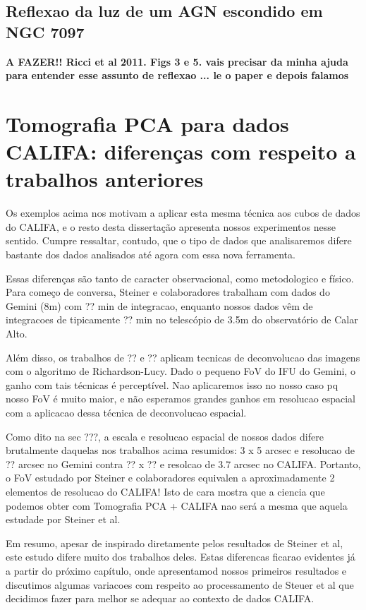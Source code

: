 \subsection{Reflexao da luz de um AGN escondido em NGC 7097}

{\bf\ojo A FAZER!! \ojo Ricci et al 2011. Figs 3 e 5. vais precisar da minha ajuda para entender esse assunto de reflexao ... le o paper e depois falamos}


\section{\ojo Tomografia PCA para dados CALIFA: diferenças com respeito a trabalhos anteriores}

Os exemplos acima nos motivam a aplicar esta mesma técnica aos cubos de dados do CALIFA, e o resto desta dissertação
apresenta nossos experimentos nesse sentido. Cumpre ressaltar, contudo, que o tipo de dados que analisaremos difere
bastante dos dados analisados até agora com essa nova ferramenta.

Essas diferenças são tanto de caracter observacional, como metodologico e físico. Para começo de conversa, Steiner e
colaboradores trabalham com dados do Gemini (8m) com ?? min de integracao, enquanto nossos dados vêm de integracoes de
tipicamente ?? min no telescópio de 3.5m do observatório de Calar Alto.

Além disso, os trabalhos de ?? e ?? aplicam tecnicas de deconvolucao das imagens com o algoritmo de Richardson-Lucy.
Dado o pequeno FoV do IFU do Gemini, o ganho com tais técnicas é perceptível. Nao aplicaremos isso no nosso caso pq
nosso FoV é muito maior, e não esperamos grandes ganhos em resolucao espacial com a aplicacao dessa técnica de
deconvolucao espacial.

Como dito na sec ???, a escala e resolucao espacial de nossos dados difere brutalmente daquelas nos trabalhos acima
resumidos: 3 x 5 arcsec e resolucao de ?? arcsec no Gemini contra ?? x ?? e resolcao de 3.7 arcsec no CALIFA. Portanto,
o FoV estudado por Steiner e colaboradores equivalen a aproximadamente 2 elementos de resolucao do CALIFA! Isto de cara
mostra que a ciencia que podemos obter com Tomografia PCA + CALIFA  nao será a mesma que aquela estudade por Steiner et
al.

Em resumo, apesar de inspirado diretamente pelos resultados de Steiner et al, este estudo difere muito dos trabalhos
deles. Estas diferencas ficarao evidentes já a partir do próximo capítulo, onde apresentamod nossos primeiros resultados
e discutimos algumas variacoes com respeito ao processamento de Steuer et al que decidimos fazer para melhor se adequar
ao contexto de dados CALIFA.


